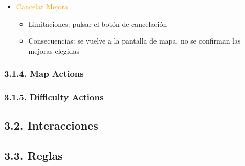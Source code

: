 \documentclass{article}
\begin{document}
\begin{itemize}
    \item \textcolor{Orange}{Cancelar Mejora}
    \begin{itemize}
        \item Limitaciones: pulsar el botón de cancelación
        \item Consecuencias: se vuelve a la pantalla de mapa, no se confirman las mejoras elegidas
    \end{itemize}
\end{itemize}

\subsubsection{3.1.4. Map Actions}

\subsubsection{3.1.5. Difficulty Actions}

\subsection{3.2. Interacciones}

\subsection{3.3. Reglas}

\end{document}
